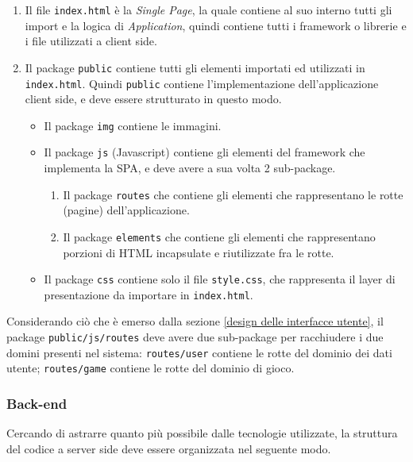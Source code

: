 \newpage

\begin{enumerate}
\item
	Il file \texttt{index.html} è la \emph{Single Page}, la quale contiene al suo interno tutti gli import e la logica di \emph{Application}, quindi contiene tutti i framework o librerie e i file utilizzati a client side.
\item
	Il package \texttt{public} contiene tutti gli elementi importati ed utilizzati in \texttt{index.html}. Quindi \texttt{public} contiene l'implementazione dell'applicazione client side, e deve essere strutturato in questo modo.
	\begin{itemize}
	\item
		Il package \texttt{img} contiene le immagini.
	\item
		Il package \texttt{js} (Javascript) contiene gli elementi del framework che implementa la SPA, e deve avere a sua volta 2 sub-package.
		\begin{enumerate}
		\item
			Il package \texttt{routes} che contiene gli elementi che rappresentano le rotte (pagine) dell'applicazione.
		\item
			Il package \texttt{elements} che contiene gli elementi che rappresentano porzioni di HTML incapsulate e riutilizzate fra le rotte.
		\end{enumerate}
	\item
		Il package \texttt{css} contiene solo il file \texttt{style.css}, che rappresenta il layer di presentazione da importare in \texttt{index.html}.
	\end{itemize}
\end{enumerate}

Considerando ciò che è emerso dalla sezione \ref{design delle interfacce utente}, il package \texttt{public/js/routes} deve avere due sub-package per racchiudere i due domini presenti nel sistema: \texttt{routes/user} contiene le rotte del dominio dei dati utente; \texttt{routes/game} contiene le rotte del dominio di gioco.

\newpage

\subsubsection{Back-end}

Cercando di astrarre quanto più possibile dalle tecnologie utilizzate, la struttura del codice a server side deve essere organizzata nel seguente modo.

